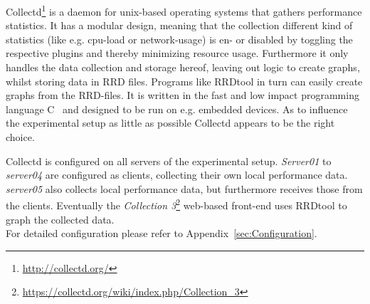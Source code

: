 Collectd\footnote{\url{http://collectd.org/}} is a daemon for unix-based operating systems that gathers performance statistics. It has a modular design, meaning that the collection different kind of statistics (like e.g. cpu-load or network-usage) is en- or disabled by toggling the respective plugins and thereby minimizing resource usage. Furthermore it only handles the data collection and storage hereof, leaving out logic to create graphs, whilst storing data in \ac{RRD} files. Programs like RRDtool in turn can easily create graphs from the RRD-files. It is written in the fast and low impact programming language C~\cite{prechelt2000empirical} and designed to be run on e.g. embedded devices.
As to influence the experimental setup as little as possible Collectd appears to be the right choice.

Collectd is configured on all servers of the experimental setup. \emph{Server01} to \emph{server04} are configured as clients, collecting their own local performance data. \emph{server05} also collects local performance data, but furthermore receives those from the clients. Eventually the \emph{Collection 3}\footnote{\url{https://collectd.org/wiki/index.php/Collection_3}} web-based front-end uses RRDtool to graph the collected data.
\\
For detailed configuration please refer to Appendix~\ref{sec:Configuration}.
